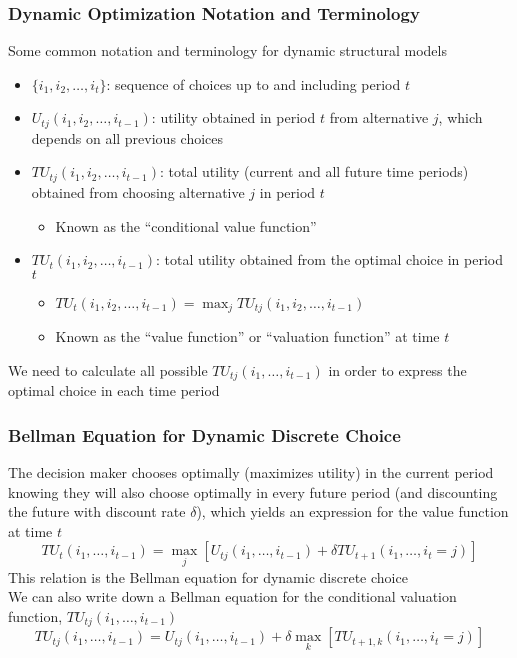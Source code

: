 \documentclass{beamer}
\begin{document}
\begin{frame}\frametitle{Dynamic Optimization Notation and Terminology}
    Some common notation and terminology for dynamic structural models
    \begin{itemize}
        \item $\{i_1, i_2, \ldots, i_t\}$: sequence of choices up to and including period $t$
        \item $U_{tj}(i_1, i_2, \ldots, i_{t-1})$: utility obtained in period $t$ from alternative $j$, which depends on all previous choices
        \item $TU_{tj}(i_1, i_2, \ldots, i_{t-1})$: total utility (current and all future time periods) obtained from choosing alternative $j$ in period $t$
        \begin{itemize}
            \item Known as the ``conditional value function''
        \end{itemize}
        \item $TU_t(i_1, i_2, \ldots, i_{t-1})$: total utility obtained from the optimal choice in period $t$
        \begin{itemize}
            \item $TU_t(i_1, i_2, \ldots, i_{t-1}) = \max_j TU_{tj}(i_1, i_2, \ldots, i_{t-1})$
            \item Known as the ``value function'' or ``valuation function'' at time $t$
        \end{itemize}
    \end{itemize}
    \vspace{2ex}
    We need to calculate all possible $TU_{tj}(i_1, \ldots, i_{t-1})$ in order to express the optimal choice in each time period
\end{frame}

\begin{frame}\frametitle{Bellman Equation for Dynamic Discrete Choice}
    The decision maker chooses optimally (maximizes utility) in the current period knowing they will also choose optimally in every future period (and discounting the future with discount rate $\delta$), which yields an expression for the value function at time $t$
    $$TU_t(i_1, \ldots, i_{t-1}) = \max_j \left[ U_{tj}(i_1, \ldots, i_{t-1}) + \delta TU_{t+1}(i_1, \ldots, i_t = j) \right]$$
    This relation is the Bellman equation for dynamic discrete choice \\
    \vspace{2ex}
    We can also write down a Bellman equation for the conditional valuation function, $TU_{tj}(i_1, \ldots, i_{t-1})$
    $$TU_{tj}(i_1, \ldots, i_{t-1}) = U_{tj}(i_1, \ldots, i_{t-1}) + \delta \max_k \left[ TU_{t+1,k}(i_1, \ldots, i_t = j) \right]$$
\end{frame}
\end{document}
